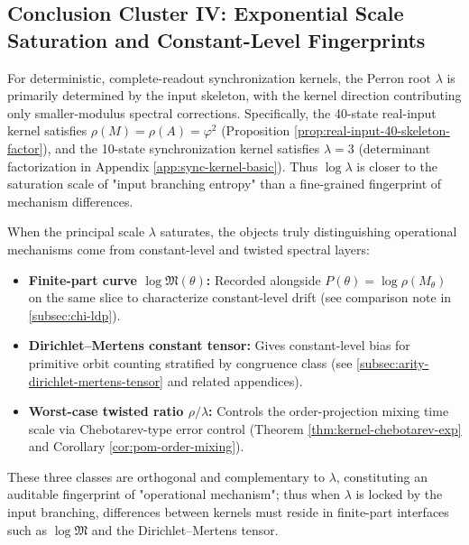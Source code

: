\subsection{Conclusion Cluster IV: Exponential Scale Saturation and Constant-Level Fingerprints}\label{subsec:pom-lambda-saturation}
\begin{proposition}\label{prop:pom-lambda-saturation}
For deterministic, complete-readout synchronization kernels, the Perron root $\lambda$ is primarily determined by the input skeleton, with the kernel direction contributing only smaller-modulus spectral corrections. Specifically, the 40-state real-input kernel satisfies $\rho(M)=\rho(A)=\varphi^2$ (Proposition \ref{prop:real-input-40-skeleton-factor}), and the 10-state synchronization kernel satisfies $\lambda=3$ (determinant factorization in Appendix \ref{app:sync-kernel-basic}). Thus $\log\lambda$ is closer to the saturation scale of "input branching entropy" than a fine-grained fingerprint of mechanism differences.
\end{proposition}

\begin{remark}\label{rem:pom-mechanism-fingerprint}
When the principal scale $\lambda$ saturates, the objects truly distinguishing operational mechanisms come from constant-level and twisted spectral layers:
\begin{itemize}
  \item \textbf{Finite-part curve $\log\mathfrak{M}(\theta)$:} Recorded alongside $P(\theta)=\log\rho(M_\theta)$ on the same slice to characterize constant-level drift (see comparison note in \ref{subsec:chi-ldp}).
  \item \textbf{Dirichlet--Mertens constant tensor:} Gives constant-level bias for primitive orbit counting stratified by congruence class (see \ref{subsec:arity-dirichlet-mertens-tensor} and related appendices).
  \item \textbf{Worst-case twisted ratio $\rho/\lambda$:} Controls the order-projection mixing time scale via Chebotarev-type error control (Theorem \ref{thm:kernel-chebotarev-exp} and Corollary \ref{cor:pom-order-mixing}).
\end{itemize}
These three classes are orthogonal and complementary to $\lambda$, constituting an auditable fingerprint of "operational mechanism"; thus when $\lambda$ is locked by the input branching, differences between kernels must reside in finite-part interfaces such as $\log\mathfrak{M}$ and the Dirichlet--Mertens tensor.
\end{remark}

